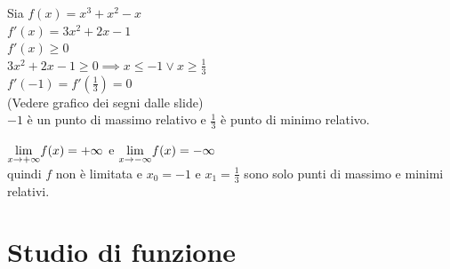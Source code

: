 \documentclass[12pt]{report}
\begin{document}
  	\begin{example}{}{}
  		Sia $f(x) = x^3 + x^2 -x$ \\
  		$f'(x) = 3x^2 + 2x - 1$ \\
  		$f'(x) \geq 0$ \\
  		$3x^2 + 2x - 1 \geq 0 \implies x \leq -1 \vee x \geq \frac{1}{3}$ \\
  		$f'(-1) = f'(\frac{1}{3}) = 0$ \\
  		(Vedere grafico dei segni dalle slide) \\
  		$-1$ è un punto di massimo relativo e $\frac{1}{3}$ è punto di minimo relativo.
  		\begin{note}{}{}
  		  $\mathlarger{\lim_{x \to +\infty}}f(x) = +\infty$ e $\mathlarger{\lim_{x \to -\infty}}f(x) = -\infty$ \\
  		  quindi $f$ non è limitata e $x_0 = -1$ e $x_1 = \frac{1}{3}$ sono solo punti di massimo e minimi relativi.
  		\end{note}
  	\end{example}
  	\section{Studio di funzione}
\end{document}
